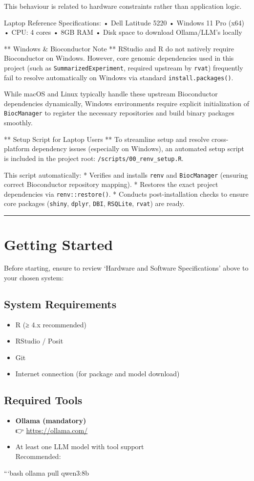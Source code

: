 \documentclass[
]{article}
\providecommand{\tightlist}{%
  \setlength{\itemsep}{0pt}\setlength{\parskip}{0pt}}
\begin{document}
This behaviour is related to hardware constraints rather than
application logic.

Laptop Reference Specifications: • Dell Latitude 5220 • Windows 11 Pro
(x64) • CPU: 4 cores • 8GB RAM • Disk space to download Ollama/LLM's
locally

** Windows \& Bioconductor Note ** RStudio and R do not natively require
Bioconductor on Windows. However, core genomic dependencies used in this
project (such as \texttt{SummarizedExperiment}, required upstream by
\texttt{rvat}) frequently fail to resolve automatically on Windows via
standard \texttt{install.packages()}.

While macOS and Linux typically handle these upstream Bioconductor
dependencies dynamically, Windows environments require explicit
initialization of \texttt{BiocManager} to register the necessary
repositories and build binary packages smoothly.

** Setup Script for Laptop Users ** To streamline setup and resolve
cross-platform dependency issues (especially on Windows), an automated
setup script is included in the project root:
\texttt{/scripts/00\_renv\_setup.R}.

This script automatically: * Verifies and installs \texttt{renv} and
\texttt{BiocManager} (ensuring correct Bioconductor repository mapping).
* Restores the exact project dependencies via \texttt{renv::restore()}.
* Conducts post-installation checks to ensure core packages
(\texttt{shiny}, \texttt{dplyr}, \texttt{DBI}, \texttt{RSQLite},
\texttt{rvat}) are ready.

\begin{center}\rule{0.5\linewidth}{0.5pt}\end{center}

\section{Getting Started}\label{getting-started}

Before starting, ensure to review `Hardware and Software Specifications'
above to your chosen system:

\subsection{System Requirements}\label{system-requirements-1}

\begin{itemize}
\tightlist
\item
  R (≥ 4.x recommended)
\item
  RStudio / Posit
\item
  Git
\item
  Internet connection (for package and model download)
\end{itemize}

\subsection{Required Tools}\label{required-tools}

\begin{itemize}
\item
  \textbf{Ollama (mandatory)}\\
  👉 \url{https://ollama.com/}
\item
  At least one LLM model with tool support\\
  Recommended:
\end{itemize}

```bash ollama pull qwen3:8b
\end{document}
